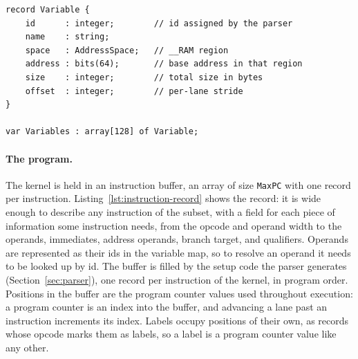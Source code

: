 \begin{lstlisting}[caption={A variable-map entry.}, label={lst:variable-record}]
record Variable {
    id      : integer;        // id assigned by the parser
    name    : string;
    space   : AddressSpace;   // __RAM region
    address : bits(64);       // base address in that region
    size    : integer;        // total size in bytes
    offset  : integer;        // per-lane stride
}

var Variables : array[128] of Variable;
\end{lstlisting}


\paragraph{The program.} The kernel is held in an instruction buffer, an
array of size \lstinline{MaxPC} with one record per instruction. Listing~\ref{lst:instruction-record}
shows the record: it is wide enough to describe any instruction of the
subset, with a field for each piece of information some instruction
needs, from the opcode and operand width to the operands, immediates,
address operands, branch target, and qualifiers. Operands are represented as their ids in the
variable map, so to resolve an operand it needs to be looked up by id. The buffer is
filled by the setup code the parser generates (Section~\ref{sec:parser}),
one record per instruction of the kernel, in program order. Positions in
the buffer are the program counter values used throughout execution: a
program counter is an index into the buffer, and advancing a lane past an
instruction increments its index. Labels occupy positions of their own, as records whose opcode marks them
as labels, so a label is a program counter value like any other.

